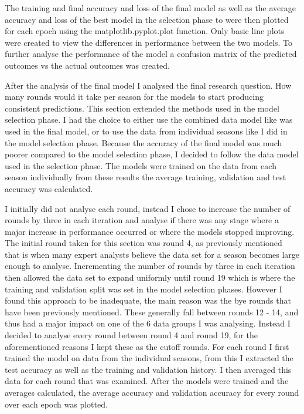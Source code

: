 \documentclass{imc-inf}
\begin{document}
	The training and final accuracy and loss of the final model as well as the average accuracy and loss of the best model in the selection phase to were then plotted for each epoch using the matplotlib.pyplot.plot function. Only basic line plots were created to view the differences in performance between the two models. To further analyse the performance of the model a confusion matrix of the predicted outcomes vs the actual outcomes was created. 
		
	After the analysis of the final model I analysed the final research question. How many rounds would it take per season for the models to start producing consistent predictions. This section extended the methods used in the model selection phase. I had the choice to either use the combined data model like was used in the final model, or to use the data from individual seasons like I did in the model selection phase.
	Because the accuracy of the final model was much poorer compared to the model selection phase, I decided to follow the data model used in the selection phase. The models were trained on the data from each season individually from these results the average training, validation and test accuracy was calculated. 
	
	I initially did not analyse each round, instead I chose to increase the number of rounds by three in each iteration and analyse if there was any stage where a major increase in performance occurred or where the models stopped improving. The initial round taken for this section was round 4, as previously mentioned that is when many expert analysts believe the data set for a season becomes large enough to analyse. Incrementing the number of rounds by three in each iteration then allowed the data set to expand uniformly until round 19 which is where the training and validation split was set in the model selection phases. However I found this approach to be inadequate, the main reason was the bye rounds that have been previously mentioned. These generally fall between rounds 12 - 14, and thus had a major impact on one of the 6 data groups I was analysing. Instead I decided to analyse every round between round 4 and round 19, for the aforementioned reasons I kept these as the cutoff rounds. 
	For each round I first trained the model on data from the individual seasons, from this I extracted the test accuracy as well as the training and validation history. I then averaged this data for each round that was examined.	After the models were trained and the averages calculated, the average accuracy and validation accuracy for every round over each epoch was plotted.
		
\end{document}
